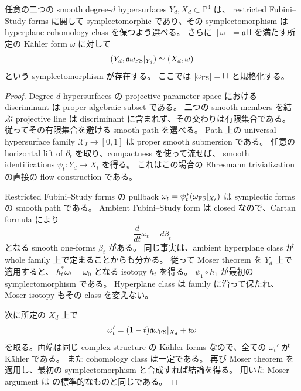 \begin{lemma}\label{tnc:transport}
任意の二つの smooth degree-$d$ hypersurfaces $Y_d,X_d\subset\mathbb P^4$ は、
restricted Fubini--Study forms に関して symplectomorphic であり、その symplectomorphism は
hyperplane cohomology class を保つよう選べる。
さらに $[\omega]=\mathfrak a\mathsf H$ を満たす所定の K\"ahler form $\omega$ に対して
\[
 (Y_d,\mathfrak a\omega_{\rm FS}|_{Y_d})
 \simeq (X_d,\omega)
\]
という symplectomorphism が存在する。
ここでは $[\omega_{\rm FS}]=\mathsf H$ と規格化する。
\end{lemma}

\begin{proof}
Degree-$d$ hypersurfaces の projective parameter space における discriminant は proper algebraic subset である。
二つの smooth members を結ぶ projective line は discriminant に含まれず、その交わりは有限集合である。
従ってその有限集合を避ける smooth path を選べる。
Path 上の universal hypersurface family $\mathcal X_I\to[0,1]$ は proper smooth submersion である。
任意の horizontal lift of $\partial_t$ を取り、compactness を使って流せば、
smooth identifications $\psi_t:Y_d\to X_t$ を得る。
これはこの場合の Ehresmann trivialization の直接の flow construction である。

Restricted Fubini--Study forms の pullback
$\omega_t=\psi_t^*(\omega_{\rm FS}|_{X_t})$ は symplectic forms の smooth path である。
Ambient Fubini--Study form は closed なので、Cartan formula により
\[
 \frac{d}{dt}\omega_t=d\beta_t
\]
となる smooth one-forms $\beta_t$ がある。
同じ事実は、ambient hyperplane class が whole family 上で定まることからも分かる。
従って Moser theorem を $Y_d$ 上で適用すると、
$h_t^*\omega_t=\omega_0$ となる isotopy $h_t$ を得る。
$\psi_1\circ h_1$ が最初の symplectomorphism である。
Hyperplane class は family に沿って保たれ、Moser isotopy もその class を変えない。

次に所定の $X_d$ 上で
\[
 \omega_t'=(1-t)\mathfrak a\omega_{\rm FS}|_{X_d}+t\omega
\]
を取る。両端は同じ complex structure の K\"ahler forms なので、全ての $\omega_t'$ が K\"ahler である。
また cohomology class は一定である。
再び Moser theorem を適用し、最初の symplectomorphism と合成すれば結論を得る。
用いた Moser argument は \cite[Section 7.2]{cds-local} の標準的なものと同じである。
\end{proof}


